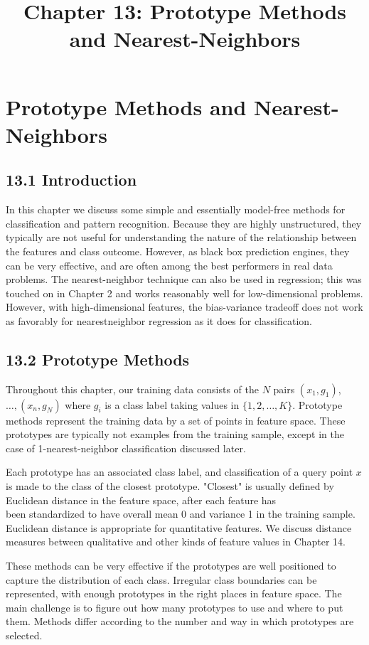 \documentclass[10pt]{article}
\title{Chapter 13: Prototype Methods and Nearest-Neighbors}
\author{}
\date{}
\begin{document}
\maketitle

\section*{Prototype Methods and Nearest-Neighbors}
\subsection*{13.1 Introduction}
In this chapter we discuss some simple and essentially model-free methods for classification and pattern recognition. Because they are highly unstructured, they typically are not useful for understanding the nature of the relationship between the features and class outcome. However, as black box prediction engines, they can be very effective, and are often among the best performers in real data problems. The nearest-neighbor technique can also be used in regression; this was touched on in Chapter 2 and works reasonably well for low-dimensional problems. However, with high-dimensional features, the bias-variance tradeoff does not work as favorably for nearestneighbor regression as it does for classification.

\subsection*{13.2 Prototype Methods}
Throughout this chapter, our training data consists of the $N$ pairs $\left(x_{1}, g_{1}\right)$, $\ldots,\left(x_{n}, g_{N}\right)$ where $g_{i}$ is a class label taking values in $\{1,2, \ldots, K\}$. Prototype methods represent the training data by a set of points in feature space. These prototypes are typically not examples from the training sample, except in the case of 1-nearest-neighbor classification discussed later.

Each prototype has an associated class label, and classification of a query point $x$ is made to the class of the closest prototype. "Closest" is usually defined by Euclidean distance in the feature space, after each feature has\\
been standardized to have overall mean 0 and variance 1 in the training sample. Euclidean distance is appropriate for quantitative features. We discuss distance measures between qualitative and other kinds of feature values in Chapter 14.

These methods can be very effective if the prototypes are well positioned to capture the distribution of each class. Irregular class boundaries can be represented, with enough prototypes in the right places in feature space. The main challenge is to figure out how many prototypes to use and where to put them. Methods differ according to the number and way in which prototypes are selected.
\end{document}
